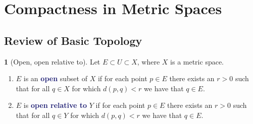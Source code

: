 \documentclass[12pt]{article}
\numberwithin{equation}{section}
\newcommand{\navy}[1]{\textcolor{MidnightBlue}{\bf #1}}
\theoremstyle{plain}
\theoremstyle{definition}
\newtheorem{definition}{\color{MidnightBlue}{\textbf{Definition}}}[section]
\newcommand{\1}{\mathbbm 1}
\begin{document}
\section{Compactness in Metric Spaces}

\subsection{Review of Basic Topology}

\begin{definition}[Open, open relative to]
	Let $E \subset U \subset X$, where $X$ is a metric space. 
	\begin{enumerate}
		\item $E$ is an \navy{open} subset of $X$ if for each point $p \in E$ there exists an $r > 0$ such that for all $q \in X$ for which $d(p,q) < r$ we have that $q \in E$. 
		\item $E$ is \navy{open relative to} $Y$ if for each point $p \in E$ there exists an $r > 0$ such that for all $q \in Y$ for which $d(p,q) < r$ we have that $q \in E$.
	\end{enumerate}
\end{definition}
\end{document}
